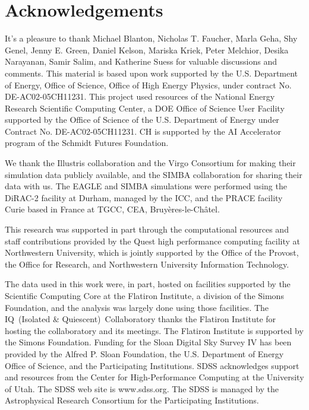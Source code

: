 \documentclass[12pt, letterpaper, preprint, comicneue]{aastex63}
\begin{document}

 





\section*{Acknowledgements}
It's a pleasure to thank 
    Michael Blanton, 
    Nicholas T. Faucher, 
    Marla Geha, 
    Shy Genel,
    Jenny E. Green,
    Daniel Kelson, 
    Mariska Kriek, 
    Peter Melchior, 
    Desika Narayanan, 
    Samir Salim, 
    and Katherine Suess for
valuable discussions and comments.
This material is based upon work supported by the U.S. Department of Energy,
Office of Science, Office of High Energy Physics, under contract No.
DE-AC02-05CH11231.  This project used resources of the National Energy Research
Scientific Computing Center, a DOE Office of Science User Facility supported by
the Office of Science of the U.S.  Department of Energy under Contract No.
DE-AC02-05CH11231. 
CH is supported by the AI Accelerator program of the Schmidt Futures Foundation.

We thank the Illustris collaboration and the Virgo Consortium for making their
simulation data publicly available, and the SIMBA collaboration for sharing
their data with us.
The EAGLE and SIMBA simulations were performed using the DiRAC-2 facility at
Durham, managed by the ICC, and the PRACE facility Curie based in France at
TGCC, CEA, Bruy\`{e}res-le-Ch\^{a}tel.

This research was supported in part through the computational resources and
staff contributions provided by the Quest high performance computing facility
at Northwestern University, which is jointly supported by the Office of the
Provost, the Office for Research, and Northwestern University Information
Technology. 

The data used in this work were, in part, hosted on facilities supported by the
Scientific Computing Core at the Flatiron Institute, a division of the Simons
Foundation, and the analysis was largely done using those facilities.
The IQ~(Isolated \& Quiescent)~Collaboratory thanks the Flatiron Institute for hosting the collaboratory and its meetings. 
The Flatiron Institute is supported by the Simons Foundation.
Funding for the Sloan Digital Sky Survey IV has been provided by the Alfred P.
Sloan Foundation, the U.S. Department of Energy Office of Science, and the
Participating Institutions. SDSS acknowledges support and resources from the
Center for High-Performance Computing at the University of Utah. The SDSS web
site is www.sdss.org.
The SDSS is managed by the Astrophysical Research Consortium for the
Participating Institutions.

\appendix
%
% 
 


 
\end{document}
